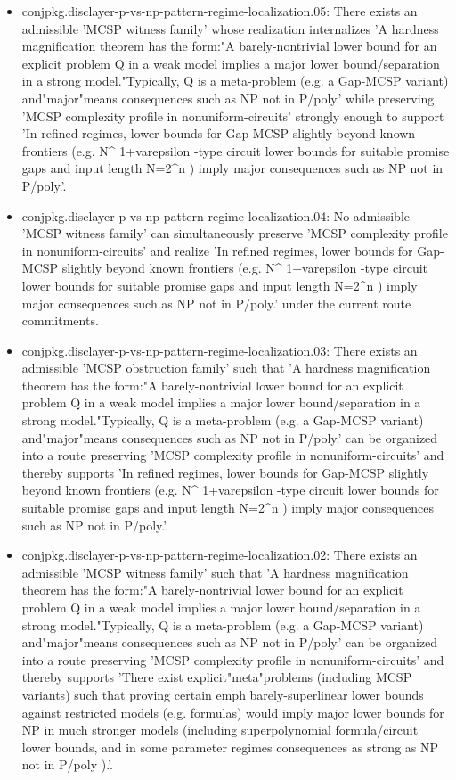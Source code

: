 \documentclass[11pt]{article}
\begin{document}
\begin{itemize}
\item conjpkg.disclayer-p-vs-np-pattern-regime-localization.05: There exists an admissible 'MCSP witness family' whose realization internalizes 'A hardness magnification theorem has the form:"A barely-nontrivial lower bound for an explicit problem Q in a weak model implies a major lower bound/separation in a strong model."Typically, Q is a meta-problem (e.g. a Gap-MCSP variant) and"major"means consequences such as NP not in P/poly.' while preserving 'MCSP complexity profile in nonuniform-circuits' strongly enough to support 'In refined regimes, lower bounds for Gap-MCSP slightly beyond known frontiers (e.g. N\textasciicircum{} 1+varepsilon -type circuit lower bounds for suitable promise gaps and input length N=2\textasciicircum{}n ) imply major consequences such as NP not in P/poly.'.
\item conjpkg.disclayer-p-vs-np-pattern-regime-localization.04: No admissible 'MCSP witness family' can simultaneously preserve 'MCSP complexity profile in nonuniform-circuits' and realize 'In refined regimes, lower bounds for Gap-MCSP slightly beyond known frontiers (e.g. N\textasciicircum{} 1+varepsilon -type circuit lower bounds for suitable promise gaps and input length N=2\textasciicircum{}n ) imply major consequences such as NP not in P/poly.' under the current route commitments.
\item conjpkg.disclayer-p-vs-np-pattern-regime-localization.03: There exists an admissible 'MCSP obstruction family' such that 'A hardness magnification theorem has the form:"A barely-nontrivial lower bound for an explicit problem Q in a weak model implies a major lower bound/separation in a strong model."Typically, Q is a meta-problem (e.g. a Gap-MCSP variant) and"major"means consequences such as NP not in P/poly.' can be organized into a route preserving 'MCSP complexity profile in nonuniform-circuits' and thereby supports 'In refined regimes, lower bounds for Gap-MCSP slightly beyond known frontiers (e.g. N\textasciicircum{} 1+varepsilon -type circuit lower bounds for suitable promise gaps and input length N=2\textasciicircum{}n ) imply major consequences such as NP not in P/poly.'.
\item conjpkg.disclayer-p-vs-np-pattern-regime-localization.02: There exists an admissible 'MCSP witness family' such that 'A hardness magnification theorem has the form:"A barely-nontrivial lower bound for an explicit problem Q in a weak model implies a major lower bound/separation in a strong model."Typically, Q is a meta-problem (e.g. a Gap-MCSP variant) and"major"means consequences such as NP not in P/poly.' can be organized into a route preserving 'MCSP complexity profile in nonuniform-circuits' and thereby supports 'There exist explicit"meta"problems (including MCSP variants) such that proving certain emph barely-superlinear lower bounds against restricted models (e.g. formulas) would imply major lower bounds for NP in much stronger models (including superpolynomial formula/circuit lower bounds, and in some parameter regimes consequences as strong as NP not in P/poly ).'.

\end{itemize}
\end{document}
